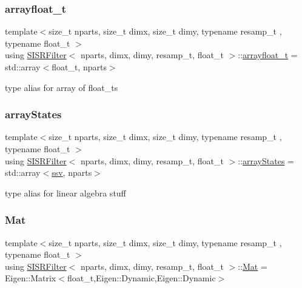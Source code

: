 \subsubsection{\texorpdfstring{arrayfloat\+\_\+t}{arrayfloat\_t}}
{\footnotesize\ttfamily template$<$size\+\_\+t nparts, size\+\_\+t dimx, size\+\_\+t dimy, typename resamp\+\_\+t , typename float\+\_\+t $>$ \\
using \hyperlink{classSISRFilter}{S\+I\+S\+R\+Filter}$<$ nparts, dimx, dimy, resamp\+\_\+t, float\+\_\+t $>$\+::\hyperlink{classSISRFilter_a35f5a590324bd78fc4f6ded236937ac2}{arrayfloat\+\_\+t} =  std\+::array$<$float\+\_\+t, nparts$>$}

type alias for array of float\+\_\+ts \mbox{\label{classSISRFilter_a5c8a38ceb31c22f3c3f38b0ead5c1ce7}} 
\subsubsection{\texorpdfstring{array\+States}{arrayStates}}
{\footnotesize\ttfamily template$<$size\+\_\+t nparts, size\+\_\+t dimx, size\+\_\+t dimy, typename resamp\+\_\+t , typename float\+\_\+t $>$ \\
using \hyperlink{classSISRFilter}{S\+I\+S\+R\+Filter}$<$ nparts, dimx, dimy, resamp\+\_\+t, float\+\_\+t $>$\+::\hyperlink{classSISRFilter_a5c8a38ceb31c22f3c3f38b0ead5c1ce7}{array\+States} =  std\+::array$<$\hyperlink{classSISRFilter_abfec45cf57ea6fadae4a9da8b0042351}{ssv}, nparts$>$}

type alias for linear algebra stuff \mbox{\label{classSISRFilter_a7355e966778c788dfe227ef5254677c4}} 
\subsubsection{\texorpdfstring{Mat}{Mat}}
{\footnotesize\ttfamily template$<$size\+\_\+t nparts, size\+\_\+t dimx, size\+\_\+t dimy, typename resamp\+\_\+t , typename float\+\_\+t $>$ \\
using \hyperlink{classSISRFilter}{S\+I\+S\+R\+Filter}$<$ nparts, dimx, dimy, resamp\+\_\+t, float\+\_\+t $>$\+::\hyperlink{classSISRFilter_a7355e966778c788dfe227ef5254677c4}{Mat} =  Eigen\+::\+Matrix$<$float\+\_\+t,Eigen\+::\+Dynamic,Eigen\+::\+Dynamic$>$}

